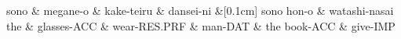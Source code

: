 \documentclass{standalone}
\begin{document}
\begin{dependency}[theme = simple, arc edge, arc angle=70, text only label, label style={above, font = \footnotesize} ]
\begin{deptext}[column sep=.1ex, row sep = .15ex]
	sono \& megane-o \& kake-teiru \& dansei-ni \&[0.1cm] sono hon-o \& watashi-nasai \\
	the \& glasses-ACC \& wear-RES.PRF \& man-DAT \& the book-ACC \& give-IMP \\
\end{deptext}
\end{dependency}
\end{document}
